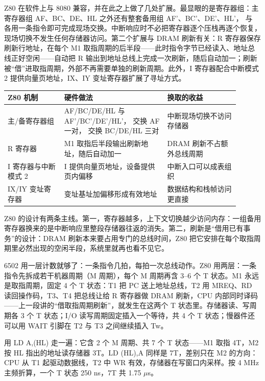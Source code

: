 Z80 在软件上与 8080 兼容，并在此之上做了几处扩展。最显眼的是寄存器组：主寄存器组 AF、BC、DE、HL 之外还有整套备用组 AF'、BC'、DE'、HL'， 与  各用一条指令即可完成现场交换。中断响应时不必把寄存器逐个压栈再逐个恢复，现场切换不发生任何存储器访问。第二个扩展与 DRAM 刷新有关：R 寄存器保存刷新行地址，在每个 M1 取指周期的后半段——此时指令字节已经读入、地址总线正好空闲——自动把 R 输出到地址总线上完成一次刷新，随后自动加一；刷新被“借”进取指周期，外部不再需要单独的刷新周期。此外，I 寄存器配合中断模式 2 提供向量页地址，IX、IY 变址寄存器扩展了寻址方式。

\begin{longtable}{L{0.22\linewidth}L{0.4\linewidth}L{0.28\linewidth}}
\toprule
Z80 机制 & 硬件做法 & 换取的收益 \\
\midrule
主/备寄存器组 & AF/BC/DE/HL 与 AF'/BC'/DE'/HL'， 交换 AF 一对， 交换 BC/DE/HL 三对 & 中断现场切换不访问存储器 \\\tablerowrule
R 寄存器 & M1 取指后半段输出刷新地址，随后自动加一 & DRAM 刷新不占额外总线周期 \\\tablerowrule
I 寄存器与中断模式 2 & I 提供向量页地址，设备提供页内偏移 & 中断入口可以成表组织 \\\tablerowrule
IX/IY 变址寄存器 & 变址基址加偏移形成有效地址 & 数据结构和栈帧访问更直接 \\
\bottomrule
\end{longtable}

Z80 的设计有两条主线。第一，寄存器越多，上下文切换越少访问内存：一组备用寄存器换来的是中断响应里整段存储器往返的消失。第二，刷新是“借用已有事务”的设计：DRAM 刷新本来要占用专门的总线时间，Z80 把它安排在每个取指周期里必然出现的空闲半段，系统里就再也看不见它。

6502 用一层计数就够了：一条指令几拍，每拍一次总线动作。Z80 用两层：一条指令先拆成若干机器周期（M 周期），每个 M 周期再含 3--6 个 T 状态。M1 永远是取指周期，固定 4 个 T 状态：T1 把 PC 送上地址总线，T2 用 MREQ、RD 读回操作码，T3、T4 把总线让给 R 寄存器做 DRAM 刷新，CPU 内部同时译码——上一段讲的“借取指周期刷新”，就发生在这两个 T 状态里。存储器读、写周期各 3 个 T 状态；I/O 读写周期固定插入一个等待，共 4 个 T 状态；慢器件还可以用 WAIT 引脚在 T2 与 T3 之间继续插入 Tw。

用 LD A,(HL) 走一遍：它含 2 个 M 周期、共 7 个 T 状态——M1 取指 4T，M2 按 HL 指出的地址读存储器 3T。LD (HL),A 同样是 7T，差别只在 M2 的方向：CPU 从 T1 起驱动数据线，T2 中 WR 有效，存储器在写窗口内采样。按 4 MHz 主频折算，一个 T 状态 250 ns，7T 共 1.75 $\mu$s。


